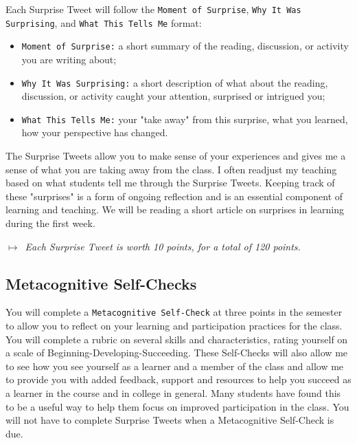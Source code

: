 \documentclass{tufte-handout}
\begin{document}
Each Surprise Tweet will follow the \texttt{Moment of Surprise}, \texttt{Why It Was Surprising}, and \texttt{What This Tells Me} format:

\begin{itemize}
	\itemsep-0.5em
	\item \texttt{Moment of Surprise:} a short summary of the reading, discussion, or activity you are writing about;
	\item \texttt{Why It Was Surprising:} a short description of what about the reading, discussion, or activity caught your attention, surprised or intrigued you;
	\item \texttt{What This Tells Me:} your "take away" from this surprise, what you learned, how your perspective has changed.
\end{itemize}

The Surprise Tweets allow you to make sense of your experiences and gives me a sense of what you are taking away from the class. I often readjust my teaching based on what students tell me through the Surprise Tweets. Keeping track of these "surprises" is a form of ongoing reflection and is an essential component of learning and teaching. We will be reading a short article on surprises in learning during the first week.

\medskip\noindent\textit{$\mapsto$~Each Surprise Tweet is worth 10 points, for a total of 120 points.}

\subsection{Metacognitive Self-Checks}

You will complete a \texttt{Metacognitive Self-Check} at three points in the semester to allow you to reflect on your learning and participation practices for the class. You will complete a rubric on several skills and characteristics, rating yourself on a scale of Beginning-Developing-Succeeding. These Self-Checks will also allow me to see how you see yourself as a learner and a member of the class and allow me to provide you with added feedback, support and resources to help you succeed as a learner in the course and in college in general. Many students have found this to be a useful way to help them focus on improved participation in the class. You will not have to complete Surprise Tweets when a Metacognitive Self-Check is due.
\end{document}
